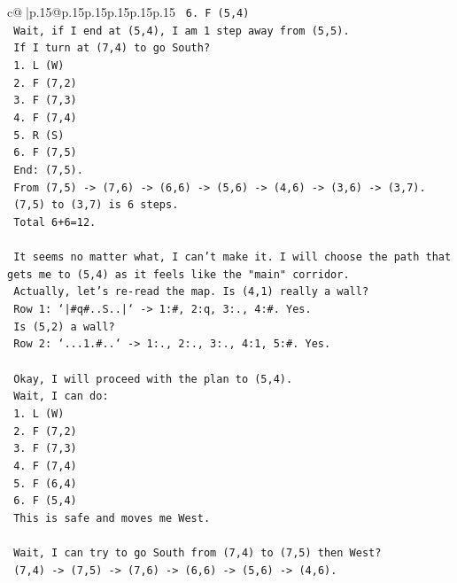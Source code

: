 \documentclass{article}
\begin{document}
{\begin{supertabular}{c@{$\;$}|p{.15\linewidth}@{}p{.15\linewidth}p{.15\linewidth}p{.15\linewidth}p{.15\linewidth}p{.15\linewidth}}
{{{\texttt{   6. F (5,4)} \\
\texttt{   Wait, if I end at (5,4), I am 1 step away from (5,5).} \\
\texttt{   If I turn at (7,4) to go South?} \\
\texttt{   1. L (W)} \\
\texttt{   2. F (7,2)} \\
\texttt{   3. F (7,3)} \\
\texttt{   4. F (7,4)} \\
\texttt{   5. R (S)} \\
\texttt{   6. F (7,5)} \\
\texttt{   End: (7,5).} \\
\texttt{   From (7,5) {-}> (7,6) {-}> (6,6) {-}> (5,6) {-}> (4,6) {-}> (3,6) {-}> (3,7).} \\
\texttt{   (7,5) to (3,7) is 6 steps.} \\
\texttt{   Total 6+6=12.} \\
\\ 
\texttt{   It seems no matter what, I can't make it. I will choose the path that gets me to (5,4) as it feels like the "main" corridor.} \\
\texttt{   Actually, let's re{-}read the map. Is (4,1) really a wall?} \\
\texttt{   Row 1: `|\#q\#..S..|` {-}> 1:\#, 2:q, 3:., 4:\#. Yes.} \\
\texttt{   Is (5,2) a wall?} \\
\texttt{   Row 2: `...1.\#..` {-}> 1:., 2:., 3:., 4:1, 5:\#. Yes.} \\
\\ 
\texttt{   Okay, I will proceed with the plan to (5,4).} \\
\texttt{   Wait, I can do:} \\
\texttt{   1. L (W)} \\
\texttt{   2. F (7,2)} \\
\texttt{   3. F (7,3)} \\
\texttt{   4. F (7,4)} \\
\texttt{   5. F (6,4)} \\
\texttt{   6. F (5,4)} \\
\texttt{   This is safe and moves me West.} \\
\\ 
\texttt{   Wait, I can try to go South from (7,4) to (7,5) then West?} \\
\texttt{   (7,4) {-}> (7,5) {-}> (7,6) {-}> (6,6) {-}> (5,6) {-}> (4,6).} \\
}}}
\end{supertabular}}
\end{document}
